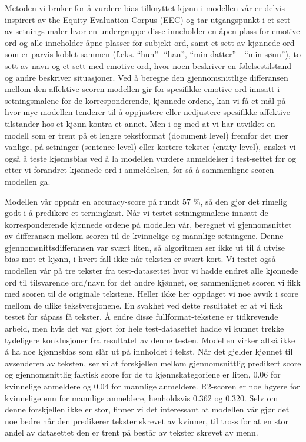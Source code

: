 \documentclass[11pt, a4paper]{article}
\begin{document}
Metoden vi bruker for å vurdere bias tilknyttet kjønn i modellen vår er delvis inspirert av the Equity Evaluation Corpus (EEC) \cite{DBLP:journals/corr/abs-1805-04508} og tar utgangspunkt i et sett av setnings-maler hvor en undergruppe disse inneholder en åpen plass for emotive ord og alle inneholder åpne plasser for subjekt-ord, samt et sett av kjønnede ord som er parvis koblet sammen (f.eks. “hun”- “han”, “min datter” - “min sønn”), to sett av navn og et sett med emotive ord, hvor noen beskriver en følelsestilstand og andre beskriver situasjoner. Ved  å beregne den gjennomsnittlige differansen mellom den affektive scoren modellen gir for spesifikke emotive ord innsatt i setningsmalene for de korresponderende, kjønnede ordene, kan vi få et mål på hvor mye modellen tenderer til å oppjustere eller nedjustere spesifikke affektive tilstander hos et kjønn kontra et annet. Men i og med at vi har utviklet en modell som er trent på et lengre tekstformat (document level) fremfor det mer vanlige, på setninger (sentence level) eller kortere tekster (entity level), ønsket vi også å teste kjønnsbias ved å la modellen vurdere anmeldelser i test-settet før og etter vi forandret kjønnede ord i anmeldelsen, for så å sammenligne scoren modellen ga.

Modellen vår oppnår en accuracy-score på rundt 57 \%, så den gjør det rimelig godt i å predikere et terningkast. Når vi testet setningsmalene innsatt de korresponderende kjønnede ordene på modellen vår, beregnet vi gjennomsnittet av differansen mellom scoren til de kvinnelige og mannlige setningene. Denne gjennomsnittsdifferansen var svært liten, så algoritmen ser ikke ut til å utvise bias mot et kjønn, i hvert fall ikke når teksten er svært kort. Vi testet også modellen vår på tre tekster fra test-datasettet hvor vi hadde endret alle kjønnede ord til tilsvarende ord/navn for det andre kjønnet, og sammenlignet scoren vi fikk med scoren til de originale tekstene. Heller ikke her oppdaget vi noe avvik i score mellom de ulike tekstversjonene. En svakhet ved dette resultatet er at vi fikk testet for såpass få tekster. Å endre disse fullformat-tekstene er tidkrevende arbeid, men hvis det var gjort for hele test-datasettet hadde vi kunnet trekke tydeligere konklusjoner fra resultatet av denne testen. Modellen virker altså ikke å ha noe kjønnsbias som slår ut på innholdet i tekst. Når det gjelder kjønnet til avsenderen av teksten, ser vi at forskjellen mellom gjennomsnittlig predikert score og gjennomsnittlig faktisk score for de to kjønnskategoriene er liten, 0.06 for kvinnelige anmeldere og 0.04 for mannlige anmeldere. R2-scoren er noe høyere for kvinnelige enn for mannlige anmeldere, henholdsvis 0.362 og 0.320. Selv om denne forskjellen ikke er stor, finner vi det interessant at modellen vår gjør det noe bedre når den predikerer tekster skrevet av kvinner, til tross for at en stor andel av datasettet den er trent på består av tekster skrevet av menn. 
\end{document}
